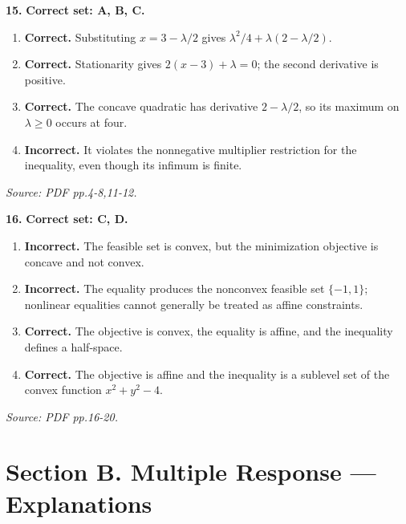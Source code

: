 \documentclass[11pt,a4paper]{article}
\begin{document}
\par\noindent\begin{minipage}{\linewidth}
\textbf{15.} \textbf{Correct set: A, B, C.}
\begin{enumerate}[label=(\Alph*),leftmargin=8mm,itemsep=2pt,topsep=2pt]
\item \textbf{Correct.} Substituting \(x=3-\lambda/2\) gives \(\lambda^2/4+\lambda(2-\lambda/2)\).
\item \textbf{Correct.} Stationarity gives \(2(x-3)+\lambda=0\); the second derivative is positive.
\item \textbf{Correct.} The concave quadratic has derivative \(2-\lambda/2\), so its maximum on \(\lambda\ge0\) occurs at four.
\item \textbf{Incorrect.} It violates the nonnegative multiplier restriction for the inequality, even though its infimum is finite.
\end{enumerate}
{\footnotesize\textit{Source: PDF pp.4-8,11-12.}}

\end{minipage}\par\vspace{3mm}
\par\noindent\begin{minipage}{\linewidth}
\textbf{16.} \textbf{Correct set: C, D.}
\begin{enumerate}[label=(\Alph*),leftmargin=8mm,itemsep=2pt,topsep=2pt]
\item \textbf{Incorrect.} The feasible set is convex, but the minimization objective is concave and not convex.
\item \textbf{Incorrect.} The equality produces the nonconvex feasible set \(\{-1,1\}\); nonlinear equalities cannot generally be treated as affine constraints.
\item \textbf{Correct.} The objective is convex, the equality is affine, and the inequality defines a half-space.
\item \textbf{Correct.} The objective is affine and the inequality is a sublevel set of the convex function \(x^2+y^2-4\).
\end{enumerate}
{\footnotesize\textit{Source: PDF pp.16-20.}}

\end{minipage}\par\vspace{3mm}
\newpage\section*{Section B. Multiple Response --- Explanations}
\end{document}
